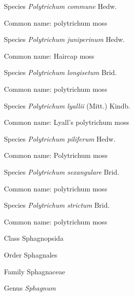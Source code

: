 \documentclass[9pt, article]{memoir}
\begin{document}
\begin{multicols}{2}
\vspace{6pt}\noindent\hspace{36pt}Species \textit{Polytrichum commune} Hedw.


Common name: polytrichum moss

\vspace{6pt}\noindent\hspace{36pt}Species \textit{Polytrichum juniperinum} Hedw.


Common name: Haircap moss

\vspace{6pt}\noindent\hspace{36pt}Species \textit{Polytrichum longisetum} Brid.


Common name: polytrichum moss

\vspace{6pt}\noindent\hspace{36pt}Species \textit{Polytrichum lyallii} (Mitt.) Kindb.


Common name: Lyall's polytrichum moss

\vspace{6pt}\noindent\hspace{36pt}Species \textit{Polytrichum piliferum} Hedw.


Common name: Polytrichum moss

\vspace{6pt}\noindent\hspace{36pt}Species \textit{Polytrichum sexangulare} Brid.


Common name: polytrichum moss

\vspace{6pt}\noindent\hspace{36pt}Species \textit{Polytrichum strictum} Brid.


Common name: polytrichum moss

\vspace{6pt}\noindent\hspace{12pt}Class Sphagnopsida


\vspace{6pt}\noindent\hspace{18pt}Order Sphagnales


\vspace{6pt}\noindent\hspace{24pt}Family Sphagnaceae


\vspace{6pt}\noindent\hspace{30pt}Genus \textit{Sphagnum}



\end{multicols}
\end{document}

